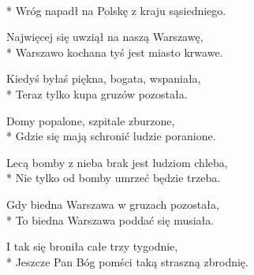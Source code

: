 \begin{lyrics}[longestline={Jeszcze Pan Bóg pomści taką straszną zbrodnię.}]

\\*
Wróg napadł na Polskę z kraju sąsiedniego.

Najwięcej się uwziął na naszą Warszawę,\\*
Warszawo kochana tyś jest miasto krwawe.

Kiedyś byłaś piękna, bogata, wspaniała,\\*
Teraz tylko kupa gruzów pozostała.

Domy popalone, szpitale zburzone,\\*
Gdzie się mają schronić ludzie poranione.

Lecą bomby z nieba brak jest ludziom chleba,\\*
Nie tylko od bomby umrzeć będzie trzeba.

Gdy biedna Warszawa w gruzach pozostała,\\*
To biedna Warszawa poddać się musiała.

I tak się broniła całe trzy tygodnie,\\*
Jeszcze Pan Bóg pomści taką straszną zbrodnię.
\end{lyrics}


